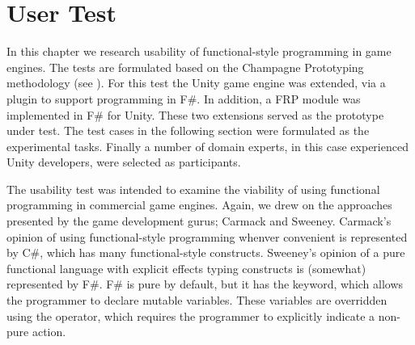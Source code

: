 \chapter{User Test}
In this chapter we research usability of functional-style programming in game engines. The tests are formulated based on the Champagne Prototyping methodology (see ). For this test the Unity game engine was extended, via a plugin to support programming in F\#\cite{fsharp2019plugin}. In addition, a \gls{FRP} module was implemented in F\# for Unity. These two extensions served as the prototype under test. The test cases in the following section were formulated as the experimental tasks. Finally a number of domain experts, in this case experienced Unity developers, were selected as participants.

The usability test was intended to examine the viability of using functional programming in commercial game engines. Again, we drew on the approaches presented by the game development gurus; Carmack and Sweeney. Carmack's opinion of using functional-style programming whenver convenient is represented by C\#, which has many functional-style constructs. Sweeney's opinion of a pure functional language with explicit effects typing constructs is (somewhat) represented by F\#. F\# is pure by default, but it has the  keyword, which allows the programmer to declare mutable variables. These variables are overridden using the \ttt{\textless-} operator, which requires the programmer to explicitly indicate a non-pure action.





